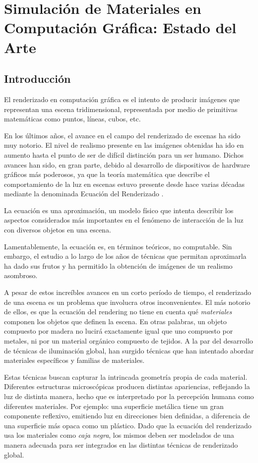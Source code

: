 
\chapter[Estado del Arte]{Simulación de Materiales en Computación Gráfica: Estado del Arte}
\section{Introducción} %
El renderizado en computación gráfica es el intento de producir imágenes que representan una escena tridimensional, representada por medio de primitivas matemáticas como puntos, líneas, cubos, etc.

En los últimos años, el avance en el campo del renderizado de escenas ha sido muy notorio. El nivel de realismo presente en las imágenes obtenidas ha ido en aumento hasta el punto de ser de difícil distinción para un ser humano. Dichos avances han sido, en gran parte, debido al desarrollo de dispositivos de hardware gráficos más poderosos, ya que la teoría matemática que describe el comportamiento de la luz en escenas estuvo presente desde hace varias décadas mediante la denominada Ecuación del Renderizado \cite{Kajiya1986}.


La ecuación es una aproximación, un modelo físico que intenta describir los aspectos considerados más importantes en el fenómeno de interacción de la luz con diversos objetos en una escena.

Lamentablemente, la ecuación es, en términos teóricos, no computable. Sin embargo, el estudio a lo largo de los años de técnicas que permitan aproximarla ha dado sus frutos y ha permitido la obtención de imágenes de un realismo asombroso.

A pesar de estos increíbles avances en un corto período de tiempo, el renderizado de una escena es un problema que involucra otros inconvenientes. El más notorio de ellos, es que la ecuación del rendering no tiene en cuenta qué {\em materiales} componen los objetos que definen la escena. En otras palabras, un objeto compuesto por madera no lucirá exactamente igual que uno compuesto por metales, ni por un material orgánico compuesto de tejidos. A la par del desarrollo de técnicas de iluminación global, han surgido técnicas que han intentado abordar materiales específicos y familias de materiales.

Estas técnicas buscan capturar la intrincada geometría propia de cada material. Diferentes estructuras microscópicas producen distintas apariencias, reflejando la luz de distinta manera, hecho que es interpretado por la percepción humana como diferentes materiales. Por ejemplo: una superficie metálica tiene un gran componente reflexivo, emitiendo luz en direcciones bien definidas, a diferencia de una superficie más opaca como un plástico. Dado que la ecuación del renderizado usa los materiales como {\em caja negra}, los mismos deben ser modelados de una manera adecuada para ser integrados en las distintas técnicas de renderizado global.

